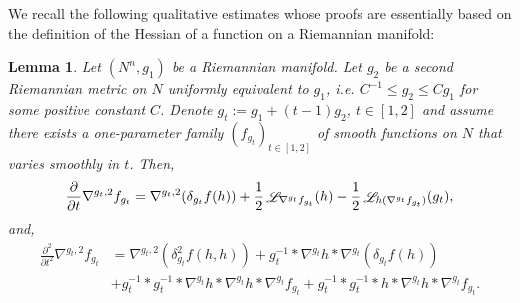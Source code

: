 \documentclass[a4paper,11pt,reqno]{amsart}
\newtheorem{lemma}[defn]{Lemma}
\def\Ric{\mathop{\rm Ric}\nolimits}
\def\Rm{\mathop{\rm Rm}\nolimits}
\def\Li{\mathop{\rm \mathscr{L}}\nolimits}
\def\Ric{\mathop{\rm Ric}\nolimits}
\def\Rm{\mathop{\rm Rm}\nolimits}
\def\Li{\mathop{\rm \mathscr{L}}\nolimits}
\numberwithin{equation}{section}
\begin{document}
	We recall the following qualitative estimates whose proofs are essentially based on the definition of the Hessian of a function on a Riemannian manifold:
	\begin{lemma}\label{lemma-app-lie-der-lin}
		Let $(N^n,g_1)$ be a Riemannian manifold. Let $g_2$ be a second Riemannian metric on $N$ uniformly equivalent to $g_1$, i.e. $C^{-1}\leq g_2\leq Cg_1$ for some positive constant $C$. Denote $g_t:=g_1+(t-1)g_2$, $t\in[1,2]$ and assume there exists a one-parameter family $(f_{g_t})_{t\in[1,2]}$ of smooth functions on $N$ that varies smoothly in $t$. Then,
		\begin{equation}
		\frac{\partial}{\partial t}\nabla^{g_t,2}f_{g_t}=\nabla^{g_t,2}(\delta_{g_t}f(h))+\frac{1}{2}\Li_{\nabla^{g_t}f_{g_t}}(h)-\frac{1}{2}\Li_{h(\nabla^{g_t}f_{g_t})}(g_t),\label{first-var-lie-der-app}
		\end{equation}
		and,
		\begin{equation}
		\begin{split}
		\frac{\partial^2}{\partial t^2}\nabla^{g_t,2}f_{g_t}&=\nabla^{g_t,2}(\delta^2_{g_t}f(h,h))+g_t^{-1}\ast \nabla^{g_t}h\ast\nabla^{g_t}(\delta_{g_t}f(h))\\
		&+g_t^{-1}\ast g_t^{-1}\ast\nabla^{g_t}h\ast\nabla^{g_t}h\ast \nabla^{g_t}f_{g_t}+g_t^{-1}\ast g_t^{-1}\ast h\ast \nabla^{g_t}h\ast\nabla^{g_t}f_{g_t}.\label{sec-var-lie-der-app}
		\end{split}
		\end{equation}
	\end{lemma}
	
	
	
	
	
	
	
	
	
	\newpage
	
	
	
	
	
	
	
	
	
\end{document}
